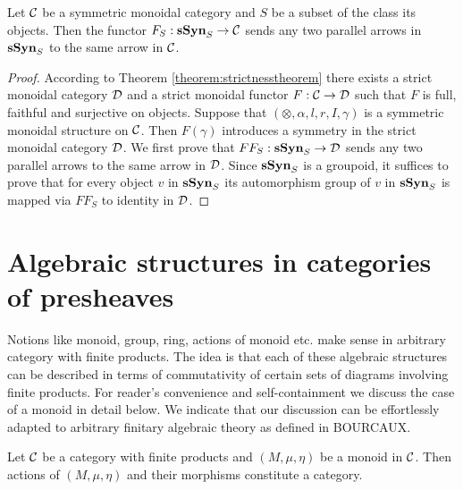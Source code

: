 \begin{theorem}\label{theorem:coherenceforsymmetric}
Let ${\mathcal C}$ be a symmetric monoidal category and $S$ be a subset of the class its objects. Then the functor $F_S:\mathbf{sSyn}_S\rightarrow {\mathcal C}$ sends any two parallel arrows in $\mathbf{sSyn}_S$ to the same arrow in ${\mathcal C}$.
\end{theorem}
\begin{proof}
According to Theorem \ref{theorem:strictnesstheorem} there exists a strict monoidal category ${\mathcal D}$ and a strict monoidal functor $F:{\mathcal C}\rightarrow {\mathcal D}$ such that $F$ is full, faithful and surjective on objects. Suppose that $(\otimes, \alpha, l, r, I, \gamma)$ is a symmetric monoidal structure on ${\mathcal C}$. Then $F(\gamma)$ introduces a symmetry in the strict monoidal category ${\mathcal D}$. We first prove that $FF_S:\mathbf{sSyn}_S\rightarrow {\mathcal D}$ sends any two parallel arrows to the same arrow in ${\mathcal D}$. Since $\mathbf{sSyn}_S$ is a groupoid, it suffices to prove that for every object $v$ in $\mathbf{sSyn}_S$ its automorphism group of $v$ in $\mathbf{sSyn}_S$ is mapped via $FF_S$ to identity in ${\mathcal D}$. 
\end{proof}






















\section{Algebraic structures in categories of presheaves}
\noindent
Notions like  monoid, group, ring, actions of monoid etc. make sense in arbitrary category with finite products. The idea is that each of these algebraic structures can be described in terms of commutativity of certain sets of diagrams involving finite products. For reader's convenience and self-containment we discuss the case of a monoid in detail below. We indicate that our discussion can be effortlessly adapted to arbitrary finitary algebraic theory as defined in BOURCAUX.



\begin{remark}
Let ${\mathcal C}$ be a category with finite products and $(M,\mu,\eta)$ be a monoid in ${\mathcal C}$. Then actions of $(M,\mu,\eta)$ and their morphisms constitute a category. 
\end{remark}

